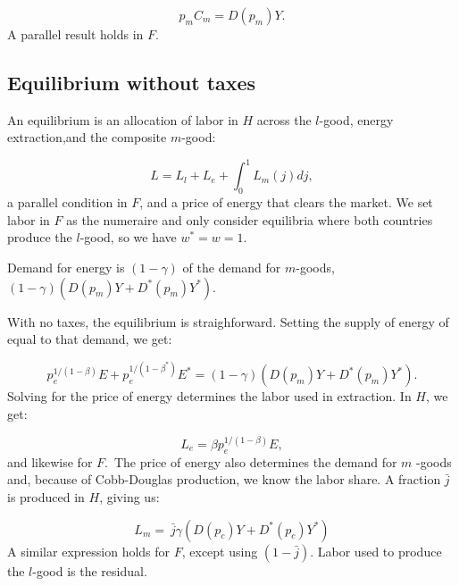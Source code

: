 \documentclass[notitlepage,12pt]{article}
\begin{document}
\begin{equation*}
p_{m}C_{m}=D\left( p_{m}\right) Y.
\end{equation*}%
A parallel result holds in $F$.

\subsection{Equilibrium without taxes}

An equilibrium is an allocation of labor in $H$ across the $l$-good, energy
extraction,and the composite $m$-good:

\begin{equation*}
L=L_{l}+L_{e}+\int_{0}^{1}L_{m}\left( j\right) dj,
\end{equation*}%
a parallel condition in $F$, and a price of energy that clears the market.
We set labor in $F$ as the numeraire and only consider equilibria where both
countries produce the $l$-good, so we have $w^{\ast }=w=1$.

Demand for energy is $\left( 1-\gamma \right) $ of the demand for $m$-goods, 
$\left( 1-\gamma \right) \left( D\left( p_{m}\right) Y+D^{\ast }\left(
p_{m}\right) Y^{\ast }\right) .$

With no taxes, the equilibrium is straighforward. Setting the supply of
energy of equal to that demand, we get:

\begin{equation}
p_{e}^{1/\left( 1-\beta \right) }E+p_{e}^{1/\left( 1-\beta ^{\ast }\right)
}E^{\ast }=\left( 1-\gamma \right) \left( D\left( p_{m}\right) Y+D^{\ast
}\left( p_{m}\right) Y^{\ast }\right) .  \label{EQ condition}
\end{equation}%
Solving for the price of energy determines the labor used in extraction. In $%
H$, we get:

\begin{equation*}
L_{e}=\beta p_{e}^{1/\left( 1-\beta \right) }E,
\end{equation*}%
and likewise for $F$.\ The price of energy also determines the demand for $m$%
-goods and, because of Cobb-Douglas production, we know the labor share. A
fraction $\bar{j}$ is produced in $H$, giving us:

\begin{equation*}
L_{m}=\ \bar{j}\gamma \left( D(p_{c})Y+D^{\ast }(p_{c})Y^{\ast }\right)
\end{equation*}%
A similar expression holds for $F$, except using $\left( 1-\bar{j}\right) $.
Labor used to produce the $l$-good is the residual.
\end{document}
